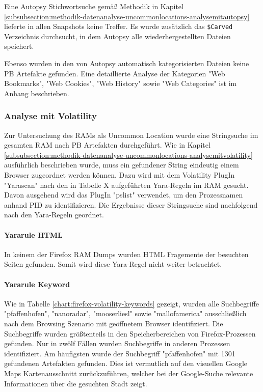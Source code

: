 Eine Autopsy Stichwortsuche gemäß Methodik in Kapitel \ref{subsubsection:methodik-datenanalyse-uncommonlocations-analysemitautopsy} lieferte in allen Snapshots keine Treffer. Es wurde zusätzlich das \texttt{\$Carved} Verzeichnis durchsucht, in dem Autopsy alle wiederhergestellten Dateien speichert.

Ebenso wurden in den von Autopsy automatisch kategorisierten Dateien keine PB Artefakte gefunden. Eine detaillierte Analyse der Kategorien "Web Bookmarks", "Web Cookies", "Web History" sowie "Web Categories" ist im Anhang \label{subsubsection:appendix-firefox-uncommon-locations-autopsy} beschrieben.

\subsubsection*{Analyse mit Volatility}
\label{subsubsection:ergebnisse-firefox-uncommonlocations-analysemitvolatility}
Zur Untersuchung des RAMs als Uncommon Location wurde eine Stringsuche im gesamten RAM nach PB Artefakten durchgeführt.
Wie in Kapitel \ref{subsubsection:methodik-datenanalyse-uncommonlocations-analysemitvolatility} ausführlich beschrieben wurde, muss ein gefundener String eindeutig einem Browser zugeordnet werden können. 
Dazu wird mit dem Volatility PlugIn "Yarascan" nach den in Tabelle X aufgeführten Yara-Regeln im RAM gesucht. Davon ausgehend wird das PlugIn "pslist" verwendet, um den Prozessnamen anhand PID zu identifizieren.
Die Ergebnisse dieser Stringsuche sind nachfolgend nach den Yara-Regeln geordnet.

\paragraph*{Yararule HTML}
In keinem der Firefox RAM Dumps wurden HTML Fragemente der besuchten Seiten gefunden. Somit wird diese Yara-Regel nicht weiter betrachtet.

\paragraph*{Yararule Keyword}
Wie in Tabelle \ref{chart:firefox-volatility-keywords} gezeigt, wurden alle Suchbegriffe "pfaffenhofen", "nanoradar", "mooserliesl" sowie "mallofamerica" ausschließlich nach dem Browsing Szenario mit geöffnetem Browser identifiziert. Die Suchbegriffe wurden größtenteils in den Speicherbereichen von Firefox-Prozessen gefunden. Nur in zwölf Fällen wurden Suchbegriffe in anderen Prozessen identifiziert. Am häufigsten wurde der Suchbegriff "pfaffenhofen" mit 1301 gefundenen Artefakten gefunden. Dies ist vermutlich auf den  visuellen Google Maps Kartenausschnitt zurückzuführen, welcher bei der Google-Suche relevante Informationen über die gesuchten Stadt zeigt. 

